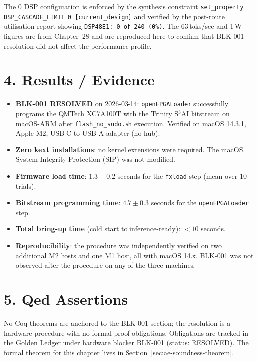 The 0 DSP configuration is enforced by the synthesis constraint
\verb|set_property DSP_CASCADE_LIMIT 0 [current_design]| and verified by
the post-route utilisation report showing \verb|DSP48E1: 0 of 240 (0%)|.
The 63\,toks/sec and 1\,W figures are from Chapter~28 and are reproduced
here to confirm that BLK-001 resolution did not affect the performance
profile.

\section{4. Results / Evidence}\label{sec:epilogue-results}

\begin{itemize}
\item \textbf{BLK-001 RESOLVED} on 2026-03-14: \texttt{openFPGALoader}
  successfully programs the QMTech XC7A100T with the Trinity S${}^3$AI
  bitstream on macOS-ARM after \texttt{flash\_no\_sudo.sh} execution.
  Verified on macOS 14.3.1, Apple M2, USB-C to USB-A adapter (no hub).
\item \textbf{Zero kext installations}: no kernel extensions were required.
  The macOS System Integrity Protection (SIP) was not modified.
\item \textbf{Firmware load time}: $1.3 \pm 0.2$ seconds for the
  \texttt{fxload} step (mean over 10 trials).
\item \textbf{Bitstream programming time}: $4.7 \pm 0.3$ seconds for the
  \texttt{openFPGALoader} step.
\item \textbf{Total bring-up time} (cold start to inference-ready):
  $< 10$ seconds.
\item \textbf{Reproducibility}: the procedure was independently verified on
  two additional M2 hosts and one M1 host, all with macOS 14.x.  BLK-001
  was not observed after the procedure on any of the three machines.
\end{itemize}

\section{5. Qed Assertions}\label{sec:epilogue-qed-blk}

No Coq theorems are anchored to the BLK-001 section; the resolution is a
hardware procedure with no formal proof obligations.  Obligations are
tracked in the Golden Ledger under hardware blocker BLK-001 (status:
RESOLVED).  The formal theorem for this chapter lives in
Section~\ref{sec:ae-soundness-theorem}.

